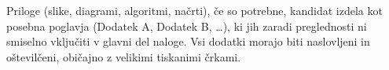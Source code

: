 \documentclass[12pt,a4paper,openany]{book}
\begin{document}
Priloge (slike, diagrami, algoritmi, načrti), 
če so potrebne, kandidat izdela kot posebna poglavja (Dodatek A, Dodatek B, \ldots), ki jih zaradi preglednosti ni smiselno vključiti v glavni
del naloge. Vsi dodatki morajo biti naslovljeni in oštevilčeni, običajno z velikimi tiskanimi črkami. 

\newpage

\listoffigures

\newpage

\listoftables




\newpage


\label{stran_literatura}
 
\end{document}
